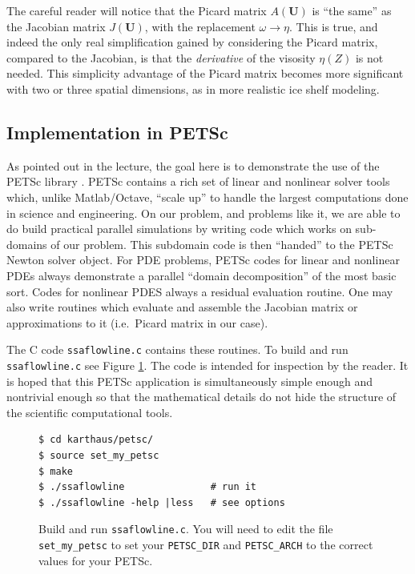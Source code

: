 \documentclass[11pt,final,reqno]{amsart}
\newcommand{\bU}{\mathbf{U}}
\begin{document}
The careful reader will notice that the Picard matrix $A(\bU)$ is ``the same'' as the Jacobian matrix $J(\bU)$, with the replacement $\omega \to \eta$.  This is true, and indeed the only real simplification gained by considering the Picard matrix, compared to the Jacobian, is that the \emph{derivative} of the visosity $\eta(Z)$ is not needed.  This simplicity advantage of the Picard matrix becomes more significant with two or three spatial dimensions, as in more realistic ice shelf modeling.

\subsection*{Implementation in PETSc}  As pointed out in the lecture, the goal here is to demonstrate the use of the PETSc library \cite{petsc-user-ref}.  PETSc contains a rich set of linear and nonlinear solver tools which, unlike Matlab/Octave, ``scale up'' to handle the largest computations done in science and engineering.  On our problem, and problems like it, we are able to do build practical parallel simulations by writing code which works on sub-domains of our problem.  This subdomain code is then ``handed'' to the PETSc Newton solver object.  For PDE problems, PETSc codes for linear and nonlinear PDEs always demonstrate a parallel ``domain decomposition'' of the most basic sort.  Codes for nonlinear PDES always a residual evaluation routine.  One may also write routines which evaluate and assemble the Jacobian matrix or approximations to it (i.e.~Picard matrix in our case).

The C code \texttt{ssaflowline.c} contains these routines.  To build and run \texttt{ssaflowline.c} see Figure \ref{fig:buildrun}.  The code is intended for inspection by the reader.  It is hoped that this PETSc application is simultaneously simple enough and nontrivial enough so that the mathematical details do not hide the structure of the scientific computational tools.

\begin{figure}[ht]
\small
\begin{Verbatim}[xleftmargin=1in, frame=single]
$ cd karthaus/petsc/
$ source set_my_petsc
$ make
$ ./ssaflowline               # run it
$ ./ssaflowline -help |less   # see options
\end{Verbatim}
\normalsize
\caption{Build and run \texttt{ssaflowline.c}.  You will need to edit the file \texttt{set\_my\_petsc} to set your \texttt{PETSC\_DIR} and \texttt{PETSC\_ARCH} to the correct values for your PETSc.}
\label{fig:buildrun}
\end{figure}
\end{document}
